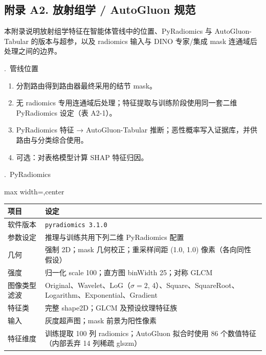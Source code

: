 \subsection*{附录 A2. 放射组学 / AutoGluon 规范}
\label{app:A2}
\begin{responseappendixprose}
\noindent 本附录说明放射组学特征在智能体管线中的位置、PyRadiomics 与 AutoGluon-Tabular 的版本与超参，以及 radiomics 输入与 DINO 专家/集成 mask 连通域后处理之间的边界。
\par
{}.~管线位置
\begin{enumerate}[leftmargin=1.6em,topsep=0.2em,itemsep=0.15em]
\item 分割路由得到路由器最终采用的结节 mask。
\item 无 radiomics 专用连通域后处理；特征提取与训练阶段使用同一套二维 PyRadiomics 设定（表 A2-1）。
\item PyRadiomics 特征 → AutoGluon-Tabular 推断；恶性概率写入证据库，并供路由与分类综合使用。
\item 可选：对表格模型计算 SHAP 特征归因。
\end{enumerate}
.~PyRadiomics
\par
\begin{responseinlinetable}
\label{tab:A2-pyradiomics}
\begin{adjustbox}{max width=\textwidth,center}
\begin{tabular}{ll}
\toprule
项目 & 设定 \\
\midrule
软件版本 & \texttt{pyradiomics 3.1.0} \\
参数设定 & 推理与训练共用下列二维 PyRadiomics 配置 \\
几何 & 强制 2D；mask 几何校正；重采样间距 (1.0, 1.0) 像素（各向同性假设） \\
强度 & 归一化 scale 100；直方图 binWidth 25；对称 GLCM \\
图像类型滤波 & Original、Wavelet、LoG（$\sigma{=}2$, 4）、Square、SquareRoot、Logarithm、Exponential、Gradient \\
特征类 & 完整 shape2D；GLCM 及预设纹理特征族 \\
输入 & 灰度超声图；mask 前景为阳性像素 \\
特征维度 & 训练提取 100 列 radiomics；AutoGluon 拟合时使用 86 个数值特征（内部丢弃 14 列稀疏 glszm） \\
\bottomrule
\end{tabular}
\end{adjustbox}
\end{responseinlinetable}


\end{responseappendixprose}
